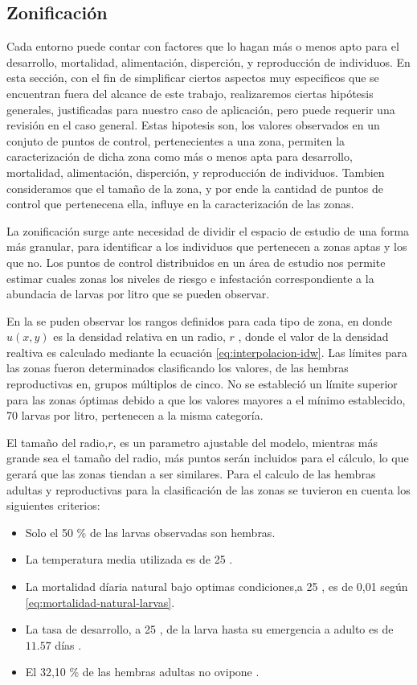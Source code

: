 \subsection{Zonificación}
\label{subsec:cap4-zonificacion}
Cada entorno puede contar con factores que lo hagan más o menos apto para el desarrollo,
mortalidad, alimentación, disperción, y reproducción de individuos. En esta sección, con el fin de
simplificar ciertos aspectos muy especificos que se encuentran fuera del alcance de este trabajo,
realizaremos ciertas hipótesis generales, justificadas para nuestro caso de aplicación, pero puede
requerir una revisión en el caso general. Estas hipotesis son, los valores observados en un
conjuto de puntos de control, pertenecientes a una zona, permiten la caracterización de dicha zona como más o menos apta para desarrollo, mortalidad, alimentación, disperción, y reproducción de
individuos. Tambien consideramos que el tamaño de la zona, y por ende la cantidad de puntos de
control que pertenecena ella, influye en la caracterización de las zonas.

La zonificación surge ante necesidad de dividir el espacio de estudio de una forma más granular,
para identificar a los individuos que pertenecen a zonas aptas y los que no. Los puntos de control
distribuidos en un área de estudio nos permite estimar cuales zonas los niveles de riesgo e
infestación correspondiente a la abundacia de larvas por litro que se pueden observar.

En la  se puden observar los rangos definidos para cada tipo de
zona, en donde $u(x,y)$ es la densidad relativa en un radio, $r$ , donde el valor de la densidad
realtiva es calculado mediante la ecuación \eqref{eq:interpolacion-idw}. Las límites para las
zonas fueron determinados clasificando los valores, de las hembras reproductivas en, grupos
múltiplos de cinco. No se estableció  un límite superior para las zonas óptimas debido a que los
valores mayores a el mínimo establecido, 70 larvas por litro, pertenecen a la misma categoría.

El tamaño del radio,$r$, es un parametro ajustable del modelo, mientras más grande sea el tamaño
del radio, más puntos serán incluidos para el cálculo, lo que gerará que las zonas tiendan a ser
similares.
Para el calculo de las hembras adultas y reproductivas para la clasificación de las zonas se
tuvieron en cuenta los siguientes criterios:

\begin{itemize}
    \item Solo el 50 \% de las larvas observadas son hembras.
    \item La temperatura media utilizada es de 25 \textcelsius.
    \item La mortalidad díaria natural bajo optimas condiciones,a 25 \textcelsius, es de 0,01
    según \eqref{eq:mortalidad-natural-larvas}.
    \item La tasa de desarrollo, a 25 \textcelsius, de la larva hasta su emergencia a adulto es de
    $11.57$ días \citep{rueda1990temperature}.
    \item El 32,10 \% de las hembras adultas no ovipone \citep{osoriopontificia}.
\end{itemize}


